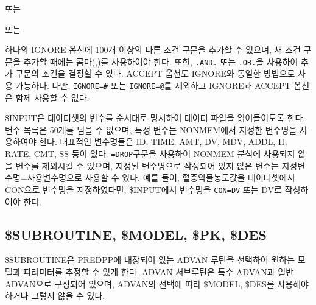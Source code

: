 \documentclass[
  10pt,
  krantz2,
  a4paper]{krantz}
\newenvironment{Shaded}{\begin{snugshade}}{\end{snugshade}}
\newcommand{\CommentTok}[1]{\textcolor[rgb]{0.56,0.35,0.01}{\textit{#1}}}
\newcommand{\NormalTok}[1]{#1}
\newcommand{\OperatorTok}[1]{\textcolor[rgb]{0.81,0.36,0.00}{\textbf{#1}}}
\newcommand{\StringTok}[1]{\textcolor[rgb]{0.31,0.60,0.02}{#1}}
\theoremstyle{definition}
\theoremstyle{definition}
\theoremstyle{definition}
\theoremstyle{remark}
\begin{document}
\begin{Shaded}
\end{Shaded}

또는

\begin{Shaded}
\end{Shaded}

또는

\begin{Shaded}
\end{Shaded}

하나의 IGNORE 옵션에 100개 이상의 다른 조건 구문을 추가할 수 있으며, 새 조건 구문을 추가할 때에는 콤마(,)를 사용하여야 한다. 또한, \texttt{.AND.} 또는 \texttt{.OR.}을 사용하여 추가 구문의 조건을 결정할 수 있다. ACCEPT 옵션도 IGNORE와 동일한 방법으로 사용 가능하다. 다만, \texttt{IGNORE=\#} 또는 \texttt{IGNORE=@}를 제외하고 IGNORE과 ACCEPT 옵션은 함께 사용할 수 없다.

\$INPUT은 데이터셋의 변수를 순서대로 명시하여 데이터 파일을 읽어들이도록 한다. 변수 목록은 50개를 넘을 수 없으며, 특정 변수는 NONMEM에서 지정한 변수명을 사용하여야 한다. 대표적인 변수명들은 ID, TIME, AMT, DV, MDV, ADDL, II, RATE, CMT, SS 등이 있다. \texttt{=DROP}구문을 사용하여 NONMEM 분석에 사용되지 않을 변수를 제외시킬 수 있으며, 지정된 변수명으로 작성되어 있지 않은 변수는 지정변수명=사용변수명으로 사용할 수 있다. 예를 들어, 혈중약물농도값을 데이터셋에서 CON으로 변수명을 지정하였다면, \$INPUT에서 변수명을 \texttt{CON=DV} 또는 DV로
작성하여야 한다.

\hypertarget{subroutine-model-pk-des}{%
\subsection{\$SUBROUTINE, \$MODEL, \$PK, \$DES}\label{subroutine-model-pk-des}}

\$SUBROUTINE은 PREDPP에 내장되어 있는 ADVAN 루틴을 선택하여 원하는 모델과 파라미터를 추정할 수 있게 한다. ADVAN 서브루틴은 특수 ADVAN과 일반 ADVAN으로 구성되어 있으며, ADVAN의 선택에 따라 \$MODEL, \$DES를 사용해야 하거나 그렇지 않을 수 있다.
\end{document}

